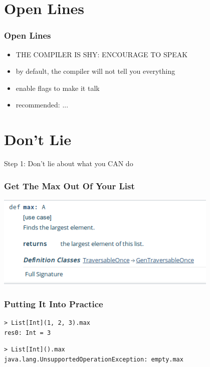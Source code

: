 \documentclass{beamer}
\begin{document}
\section{Open Lines}

\begin{frame}
  \frametitle{Open Lines}
  \begin{itemize}
  \item THE COMPILER IS SHY: ENCOURAGE TO SPEAK
  \item by default, the compiler will not tell you everything
  \item enable flags to make it talk
  \item recommended: ...
  \end{itemize}
\end{frame}

\section{Don't Lie}

\begin{frame}[c]
  \begin{center}
    \Large Step 1: Don't lie about what you CAN do
  \end{center}
\end{frame}

\begin{frame}[fragile]
  \frametitle{Get The Max Out Of Your List}
  \includegraphics[width=0.8\textwidth]{../pics/list-max.png}
\end{frame}

\begin{frame}
  \frametitle{Putting It Into Practice}
  \begin{verbatim}
> List[Int](1, 2, 3).max
res0: Int = 3
\end{verbatim}
\begin{verbatim}
> List[Int]().max                                                             
java.lang.UnsupportedOperationException: empty.max                                 
\end{verbatim}
\end{frame}
\end{document}
